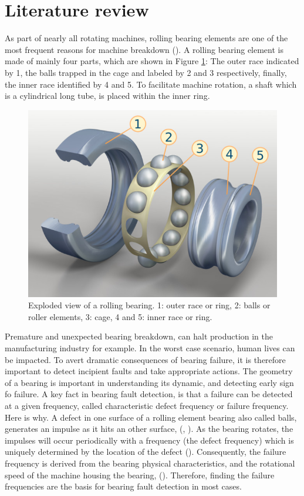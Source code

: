 \documentclass[../Main/thesis.tex]{subfiles}
\begin{document}
\section{Literature review}
\label{sec:relatedwork}
As part of nearly all rotating machines, rolling bearing elements are one of the most frequent reasons for machine breakdown (\cite{randal2010}). A rolling bearing element is made of mainly four parts, which are shown in Figure \ref{fig:bearing-s}: The outer race indicated by 1, the balls trapped in the cage and labeled by 2 and 3 respectively, finally, the inner race identified by 4 and 5. To facilitate machine rotation, a shaft which is a cylindrical long tube, is placed within the inner ring.
\begin{figure}[H]
	\centering
	\includegraphics[width=0.5\linewidth]{../fig/bearing-s}
	\caption{Exploded view of a rolling bearing. 1: outer race or ring, 2: balls or roller elements, 3: cage, 4 and 5: inner race or ring.}
	\label{fig:bearing-s}
\end{figure}
\justify
Premature and unexpected bearing breakdown, can halt production in the manufacturing industry for example. In the worst case scenario, human lives can be impacted. To avert dramatic consequences of bearing failure, it is therefore important to detect incipient faults and take appropriate actions.
\justify
The geometry of a bearing is important in understanding its dynamic, and detecting early sign fo failure.
 A key fact in bearing fault detection, is that a failure can be detected at a given frequency, called characteristic defect frequency or failure frequency. Here is why. A defect in one surface of a rolling element bearing also called balls, generates an impulse as it hits an other surface, (\cite{mcfadden1984a}, \cite{mcfadden1984b}). As the bearing rotates, the impulses will occur periodically with a frequency (the defect frequency) which is uniquely determined by the location of the defect (\cite{mcfadden1984a}). Consequently, the failure frequency is derived from the bearing physical characteristics, and the rotational speed of the machine housing the bearing, (\cite{mcfadden1984a}). Therefore, finding the failure frequencies are the basis for bearing fault detection in most cases.
\end{document}
